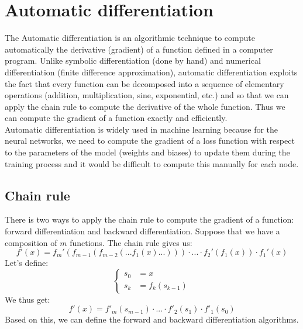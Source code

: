 \documentclass[12pt, openany]{report}
\theoremstyle{definition}
\begin{document}
\setcounter{tocdepth}{1}
\tableofcontents
\chapter{Automatic differentiation}
The Automatic differentiation is an algorithmic technique to compute automatically the derivative (gradient) of a function defined in a computer program. Unlike symbolic differentiation (done by hand) and numerical  differentiation (finite difference approximation), automatic differentiation exploits the fact that every function can be decomposed into a sequence of elementary operations (addition, multiplication, sine, exponential, etc.) and so that we can apply the chain rule to compute the derivative of the whole function. Thus we can compute the gradient of a function exactly and efficiently.\\ 
Automatic differentiation is widely used in machine learning because for the neural networks, we need to compute the gradient of a loss function with respect to the parameters of the model (weights and biases) to update them during the training process and it would be difficult to compute this manually for each node.\\
\section{Chain rule}
There is two ways to apply the chain rule to compute the gradient of a function: forward differentiation and backward differentiation. Suppose that we have a composition of $m$ functions. The chain rule gives us:
\begin{equation}
  f'(x) = f_m'(f_{m-1}(f_{m-2}(...f_1(x)...))) \cdot ... \cdot f_2'(f_1(x)) \cdot f_1'(x)
\end{equation}
Let's define:
\begin{equation}
  \begin{cases}
    s_0 &= x \\
    s_k &= f_k(s_{k-1})
  \end{cases}
\end{equation}
We thus get:
\begin{equation}
  f'(x) = f'_m(s_{m-1}) \cdot ...
  \cdot f'_2(s_1) \cdot f'_1(s_0)
\end{equation}
Based on this, we can define the forward and backward differentiation algorithms.
\end{document}
